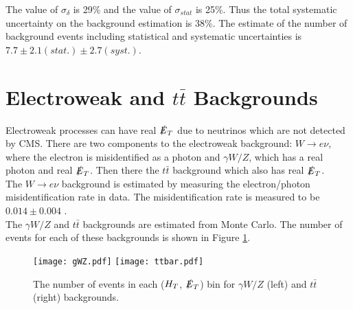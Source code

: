 The value of $\sigma_{\delta}$ is 29\unit{\%} and the value of $\sigma_{stat}$
is 25\unit{\%}. Thus the total systematic uncertainty on the background 
estimation is 38\unit{\%}. The estimate of the number of background events 
including statistical and systematic uncertainties is 
$7.7\pm2.1(stat.)\pm2.7(syst.)$.

\section{Electroweak and $t\bar{t}$ Backgrounds}

Electroweak processes can have real $\slashed{E}_{T}$ due to neutrinos which are not
detected by CMS. There are two components to the electroweak background:
$W\rightarrow e\nu$, where the electron is misidentified as a photon and 
$\gamma W/Z$, which has a real photon and real $\slashed{E}_{T}$. Then there the $t\bar{t}$
background which also has real $\slashed{E}_{T}$. \\

The $W\rightarrow e\nu$ background is estimated by measuring the electron/photon
misidentification rate in data. The misidentification rate is measured to be
$0.014\pm0.004$ \cite{ra3}. \\

The $\gamma W/Z$ and $t\bar{t}$ backgrounds are estimated from Monte Carlo. The
number of events for each of these backgrounds is shown in Figure
\ref{fig:wz_and_ttbar}.

\begin{figure}
\begin{center}
\texttt{[image: gWZ.pdf]}
\texttt{[image: ttbar.pdf]}
\end{center}
\caption{The number of events in each ($H_{T}$, $\slashed{E}_{T}$) bin for $\gamma W/Z$
(left) and $t\bar{t}$ (right) backgrounds.}
\label{fig:wz_and_ttbar}
\end{figure}




